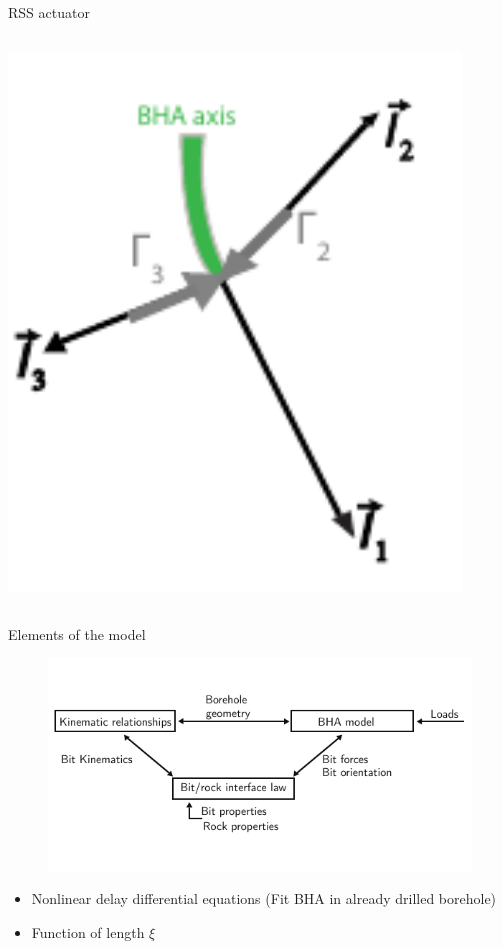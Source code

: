 \documentclass{beamer}
\begin{document}
\begin{frame}{RSS actuator}
\begin{columns}[T]
\begin{column}{0.5\textwidth}
					\includegraphics[width=0.9\textwidth]{images/RSSForce.pdf}				
			\end{column}
		\end{columns}
\end{frame}

\begin{frame}{Elements of the model}
	\begin{figure}[ht]\centering
		\includegraphics[width=1\textwidth]{images/modelinteraction.pdf}
	\end{figure}\vspace{-20pt}
	\begin{itemize}\setlength\itemsep{0.5em}
			\item Nonlinear delay differential equations (Fit BHA in already drilled borehole)
			\item Function of length $\xi$
		\end{itemize}
\end{frame}
\end{document}
